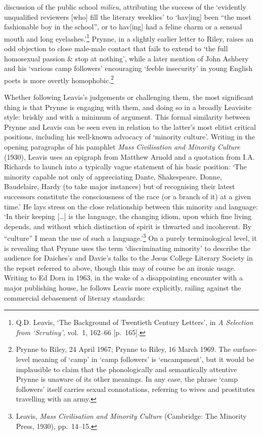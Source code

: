 \documentclass[]{article}
\begin{document}
discussion of the public school \emph{milieu}, attributing the success
of the ‘evidently unqualified reviewers {[}who{]} fill the literary
weeklies’ to ‘hav{[}ing{]} been “the most fashionable boy in the
school”, or to hav{[}ing{]} had a feline charm or a sensual mouth and
long eyelashes.’\footnote{Q.D. Leavis, ‘The Background of Twentieth
  Century Letters’, in \emph{A Selection from ‘Scrutiny’}, vol.~1,
  162–66 {[}p.~165{]}.} Prynne, in a slightly earlier letter to Riley,
raises an odd objection to close male-male contact that fails to extend
to ‘the full homosexual passion \& stop at nothing’, while a later
mention of John Ashbery and his ‘various camp followers’ encouraging
‘feeble insecurity’ in young English poets is more overtly
homophobic.\footnote{Prynne to Riley, 24 April 1967; Prynne to Riley, 16
  March 1969. The surface-level meaning of ‘camp’ in ‘camp followers’ is
  ‘encampment’, but it would be implausible to claim that the
  phonologically and semantically attentive Prynne is unaware of its
  other meanings. In any case, the phrase ‘camp followers’ itself
  carries sexual connotations, referring to wives and prostitutes
  travelling with an army.}

Whether following Leavis’s judgements or challenging them, the most
significant thing is that Prynne is engaging with them, and doing so in
a broadly Leavisite style: briskly and with a minimum of argument. This
formal similarity between Prynne and Leavis can be seen even in relation
to the latter’s most elitist critical positions, including his
well-known advocacy of ‘minority culture’. Writing in the opening
paragraphs of his pamphlet \emph{Mass Civilisation and Minority Culture}
(1930), Leavis uses an epigraph from Matthew Arnold and a quotation from
I.A. Richards to launch into a typically vague statement of his basic
position: ‘The minority capable not only of appreciating Dante,
Shakespeare, Donne, Baudelaire, Hardy (to take major instances) but of
recognising their latest successors constitute the consciousness of the
race (or a branch of it) at a given time.’ He lays stress on the close
relationship between this minority and language: ‘In their keeping
{[}\ldots{}{]} is the language, the changing idiom, upon which fine
living depends, and without which distinction of spirit is thwarted and
incoherent. By “culture” I mean the use of such a language.’\footnote{Leavis,
  \emph{Mass Civilisation and Minority Culture} (Cambridge: The Minority
  Press, 1930), pp.~14–15.} On a purely terminological level, it is
revealing that Prynne uses the term ‘discriminating minority’ to
describe the audience for Daiches’s and Davie’s talks to the Jesus
College Literary Society in the report referred to above, though this
may of course be an ironic usage. Writing to Ed Dorn in 1963, in the
wake of a disappointing encounter with a major publishing house, he
follows Leavis more explicitly, railing against the commercial
debasement of literary standards:
\end{document}

